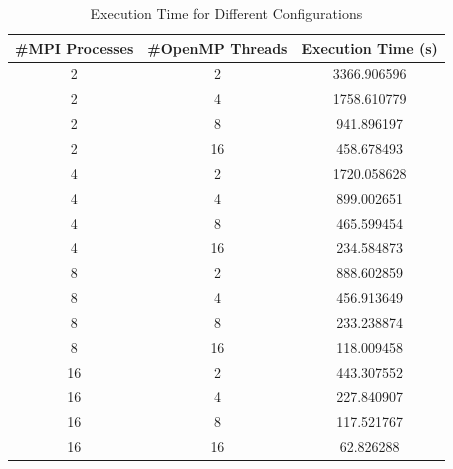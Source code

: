 \documentclass{solutionclass} %
\begin{document}
\begin{table}[ht]
    \centering
    \caption{Execution Time for Different Configurations}
    \begin{tabular}{ccc}
        \textbf{\#MPI Processes} & \textbf{\#OpenMP Threads} & \textbf{Execution Time (s)} \\
        \hline
        2 & 2 & 3366.906596 \\ 
        \hline
        2 & 4 & 1758.610779 \\
        \hline
        2 & 8 & 941.896197 \\
        \hline
        2 & 16 & 458.678493 \\
        \hline
        4 & 2 & 1720.058628 \\
        \hline
        4 & 4 & 899.002651 \\
        \hline
        4 & 8 & 465.599454 \\
        \hline
        4 & 16 & 234.584873 \\
        \hline
        8 & 2 & 888.602859 \\
        \hline
        8 & 4 & 456.913649 \\
        \hline
        8 & 8 & 233.238874 \\
        \hline
        8 & 16 & 118.009458 \\
        \hline
        16 & 2 & 443.307552 \\
        \hline
        16 & 4 & 227.840907 \\
        \hline
        16 & 8 & 117.521767 \\
        \hline
        16 & 16 & 62.826288 \\
        \hline
    \end{tabular}
    \label{tab:execution_time}
\end{table}
\end{document}
